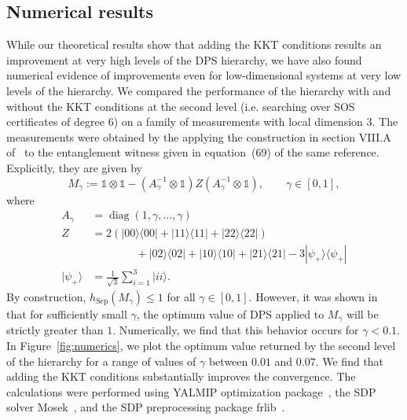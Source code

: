 \documentclass[aps,pra,notitlepage,preprintnumbers,11pt,tightenlines]{revtex4-1}
\newcommand{\bra}[1]{\langle #1 |}
\newcommand{\ket}[1]{| #1 \rangle}
\newcommand{\ident}{\mathbb{1}}
\DeclareMathOperator{\Sep}{Sep}
\DeclareMathOperator{\diag}{diag}
\begin{document}
\subsection{Numerical results}
\label{sec:numerics}
While our theoretical results show that adding the KKT conditions
results an improvement at very high levels of the DPS hierarchy,
we have also found numerical evidence of improvements even for
low-dimensional systems at very low levels of the
hierarchy. We compared the performance of the hierarchy with and
without the KKT conditions at the second level (i.e. searching over
SOS certificates of degree $6$) on a family of measurements with local
dimension $3$. The measurements were obtained by the applying the
construction in section VIII.A of~\cite{dps:2003} to the entanglement
witness given in equation~(69) of the same reference. Explicitly, they
are given by
\begin{equation} M_\gamma := \ident\otimes \ident - (A_\gamma^{-1} \otimes \ident) Z (A_\gamma^{-1} \otimes
\ident), \qquad \gamma \in [0, 1], \label{eq:dps_example} \end{equation}
where 
\begin{align*}
  A_\gamma &= \diag(1, \gamma, \dots, \gamma) \\
  Z &= 2(\ket{00}\bra{00} + \ket{11}\bra{11} + \ket{22}\bra{22}) \\
  &\qquad\qquad +
      \ket{02}\bra{02} + \ket{10}\bra{10} +\ket{21}\bra{21} -
      3\ket{\psi_+}\bra{\psi_+} \\
  \ket{\psi_+} &= \frac{1}{\sqrt{3}} \sum_{i=1}^{3} \ket{ii}.
\end{align*}
By construction, $h_{\Sep}(M_\gamma) \leq 1$ for all $\gamma \in
[0,1]$. However, it was shown in~\cite{dps:2003} that for sufficiently
small $\gamma$, the optimum value of DPS applied to $M_\gamma$ will be
strictly greater than $1$. Numerically, we find that this behavior
occurs for $\gamma < 0.1$. In Figure~\ref{fig:numerics}, we plot the
optimum value returned by the second level of the hierarchy for a
range of values of $\gamma$ between $0.01$ and $0.07$. We find that
adding the KKT conditions substantially improves the convergence. The
calculations were performed using YALMIP optimization
package~\cite{Lofberg2004,Lofberg2009}, the
SDP solver Mosek~\cite{mosek}, and the SDP preprocessing package frlib~\cite{Permenter14}.
\end{document}
